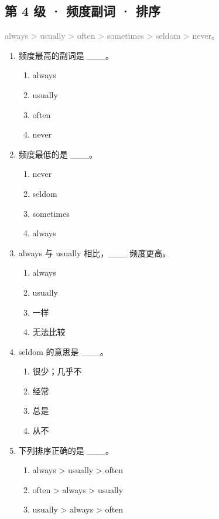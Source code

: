 \documentclass[11pt,a4paper]{ctexart}
\begin{document}
\subsection*{第 4 级 · 频度副词 · 排序}
\noindent\textcolor{gray}{always > usually > often > sometimes > seldom > never。}\par\smallskip
\begin{enumerate}[leftmargin=*,itemsep=4pt]
\item 频度最高的副词是 \_\_\_。
\begin{enumerate}[label=\Alph*.,leftmargin=2em,itemsep=1pt,topsep=2pt]
\item always
\item usually
\item often
\item never
\end{enumerate}
\item 频度最低的是 \_\_\_。
\begin{enumerate}[label=\Alph*.,leftmargin=2em,itemsep=1pt,topsep=2pt]
\item never
\item seldom
\item sometimes
\item always
\end{enumerate}
\item always 与 usually 相比，\_\_\_ 频度更高。
\begin{enumerate}[label=\Alph*.,leftmargin=2em,itemsep=1pt,topsep=2pt]
\item always
\item usually
\item 一样
\item 无法比较
\end{enumerate}
\item seldom 的意思是 \_\_\_。
\begin{enumerate}[label=\Alph*.,leftmargin=2em,itemsep=1pt,topsep=2pt]
\item 很少；几乎不
\item 经常
\item 总是
\item 从不
\end{enumerate}
\item 下列排序正确的是 \_\_\_。
\begin{enumerate}[label=\Alph*.,leftmargin=2em,itemsep=1pt,topsep=2pt]
\item always > usually > often
\item often > always > usually
\item usually > always > often

\end{enumerate}
\end{enumerate}
\end{document}
